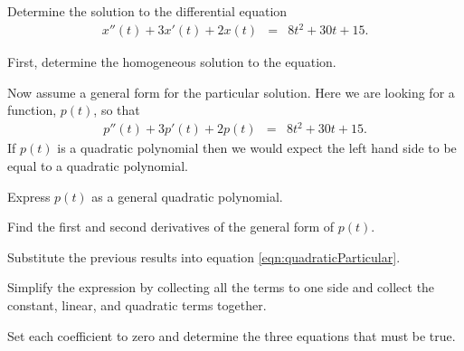   \begin{problem}

    \item Determine the solution to the differential equation
      \begin{eqnarray*}
        x''(t) + 3x'(t) + 2x(t) & = & 8 t^2 + 30t + 15.
      \end{eqnarray*}

      \begin{subproblem}
        \item First, determine the homogeneous solution to the
          equation.

          \vfill

        \item Now assume a general form for the particular
          solution. Here we are looking for a function, $p(t)$, so
          that 
          \begin{eqnarray}
            p''(t) + 3p'(t) + 2p(t) & = & 8 t^2 + 30t + 15.
            \label{eqn:quadraticParticular}
          \end{eqnarray}
          If $p(t)$ is a quadratic polynomial then we would expect the
          left hand side to be equal to a quadratic polynomial.

          Express $p(t)$ as a general quadratic polynomial.

          \vspace*{4em}

        \item Find the first and second derivatives of the general
          form of $p(t)$.

          \vfill

          \clearpage

        \item Substitute the previous results into equation
          \ref{eqn:quadraticParticular}.

          \vfill

        \item Simplify the expression by collecting all the terms to
          one side and collect the constant, linear, and quadratic
          terms together.

          \vfill

        \item Set each coefficient to zero and determine the three
          equations that must be true.

          \vfill


\end{subproblem}
\end{problem}
